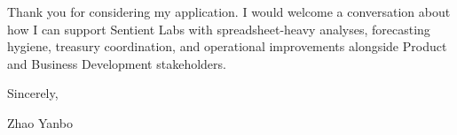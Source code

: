 \documentclass[10pt,a4paper]{article}
\begin{document}
Thank you for considering my application. I would welcome a conversation about how I can support Sentient Labs with spreadsheet-heavy analyses, forecasting hygiene, treasury coordination, and operational improvements alongside Product and Business Development stakeholders.

\vspace{1em}

Sincerely,

\vspace{2em}

Zhao Yanbo
\end{document}

